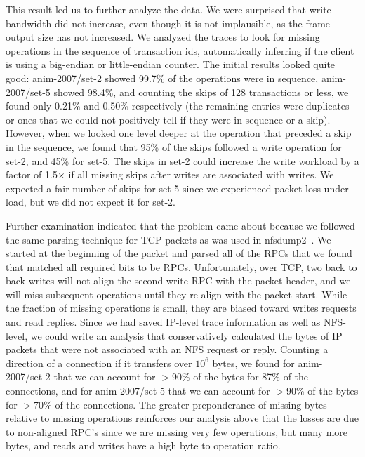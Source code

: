 This result led us to further analyze the data.  We were surprised
that write bandwidth did not increase, even though it is not
implausible, as the frame output size has not increased.  We analyzed
the traces to look for missing operations in the sequence of
transaction ids, automatically inferring if the client is using a
big-endian or little-endian counter.  The initial results looked quite
good: anim-2007/set-2 showed 99.7\% of the operations were in sequence,
anim-2007/set-5 showed 98.4\%, and counting the skips of 128 transactions
or less, we found only 0.21\% and 0.50\% respectively (the remaining
entries were duplicates or ones that we could not positively tell if
they were in sequence or a skip).  However, when we looked one level
deeper at the operation that preceded a skip in the sequence, we found
that 95\% of the skips followed a write operation for set-2, and 45\%
for set-5.  The skips in set-2 could increase the write workload by a
factor of 1.5$\times$ if all missing skips after writes are associated with
writes.  We expected a fair number of skips for set-5 since we
experienced packet loss under load, but we did not expect it for
set-2. 

Further examination indicated that the problem came about because we
followed the same parsing technique for TCP packets as was used in
nfsdump2~\cite{ellardTraces}.  We started at the beginning of the
packet and parsed all of the RPCs that we found that matched all
required bits to be RPCs.  Unfortunately, over TCP, two back to back
writes will not align the second write RPC with the packet header, and
we will miss subsequent operations until they re-align with the packet
start.  While the fraction of missing operations is small, they are
biased toward writes requests and read replies. Since we had saved
IP-level trace information as well as NFS-level, we could write an
analysis that conservatively calculated the bytes of IP packets that
were not associated with an NFS request or reply.  Counting a
direction of a connection if it transfers over $10^6$ bytes, we found
for anim-2007/set-2 that we can account for $>$90\% of the bytes for
87\% of the connections, and for anim-2007/set-5 that we can account
for $>$90\% of the bytes for $>$70\% of the connections.  The greater
preponderance of missing bytes relative to missing operations
reinforces our analysis above that the losses are due to non-aligned
RPC's since we are missing very few operations, but many more bytes,
and reads and writes have a high byte to operation ratio.

